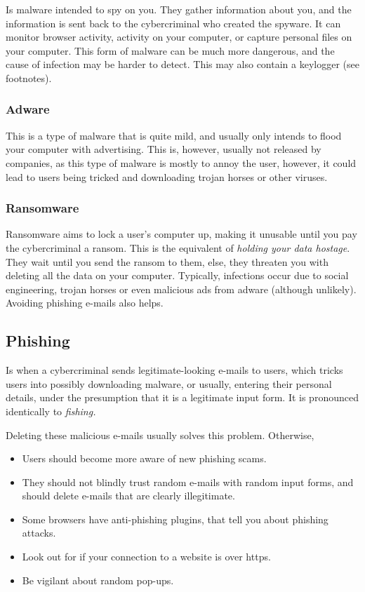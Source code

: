 \documentclass[../main.tex]{subfiles}
\begin{document}
Is malware intended to spy on you. They gather information about you, and the information is sent back to the cybercriminal who created the spyware. It can monitor browser activity, activity on your computer, or capture personal files on your computer. This form of malware can be much more dangerous, and the cause of infection may be harder to detect. This may also contain a keylogger (see footnotes).

\subsubsection{Adware}

This is a type of malware that is quite mild, and usually only intends to flood your computer with advertising. This is, however, usually not released by companies, as this type of malware is mostly to annoy the user, however, it could lead to users being tricked and downloading trojan horses or other viruses.

\subsubsection{Ransomware}

Ransomware aims to lock a user's computer up, making it unusable until you pay the cybercriminal a ransom. This is the equivalent of \emph{holding your data hostage}. They wait until you send the ransom to them, else, they threaten you with deleting all the data on your computer. Typically, infections occur due to social engineering, trojan horses or even malicious ads from adware (although unlikely). Avoiding phishing e-mails also helps.

\subsection{Phishing}

Is when a cybercriminal sends legitimate-looking e-mails to users, which tricks users into possibly downloading malware, or usually, entering their personal details, under the presumption that it is a legitimate input form. It is pronounced identically to \emph{fishing.}

Deleting these malicious e-mails usually solves this problem. Otherwise,

\begin{itemize}
    \item Users should become more aware of new phishing scams.
    \item They should not blindly trust random e-mails with random input forms, and should delete e-mails that are clearly illegitimate.
    \item Some browsers have anti-phishing plugins, that tell you about phishing attacks.
    \item Look out for if your connection to a website is over {\ccmono https}.
    \item Be vigilant about random pop-ups.
\end{itemize}
\end{document}
